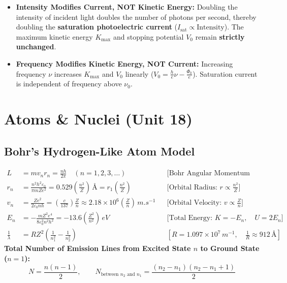 \documentclass[11pt,a4paper]{article}
\begin{document}
\begin{trapbox}
\begin{itemize}
  \item \textbf{Intensity Modifies Current, NOT Kinetic Energy:} Doubling the intensity of incident light doubles the number of photons per second, thereby doubling the \textbf{saturation photoelectric current} ($I_{\text{sat}} \propto \text{Intensity}$). The maximum kinetic energy $K_{\max}$ and stopping potential $V_0$ remain \textbf{strictly unchanged}.
  \item \textbf{Frequency Modifies Kinetic Energy, NOT Current:} Increasing frequency $\nu$ increases $K_{\max}$ and $V_0$ linearly ($V_0 = \frac{h}{e}\nu - \frac{\Phi_0}{e}$). Saturation current is independent of frequency above $\nu_0$.
\end{itemize}
\end{trapbox}

\newpage

\section{Atoms \& Nuclei (Unit 18)}

\subsection{Bohr's Hydrogen-Like Atom Model}

\begin{formulabox}
\begin{align}
  L &= m v_n r_n = \frac{n h}{2\pi} \quad (n = 1, 2, 3, \dots) && \text{[Bohr Angular Momentum Quantization]} \\
  r_n &= \frac{n^2 h^2 \varepsilon_0}{\pi m Z e^2} = 0.529\left(\frac{n^2}{Z}\right)\,\text{\AA} = r_1\left(\frac{n^2}{Z}\right) && \text{[Orbital Radius: } r \propto \frac{n^2}{Z}\text{]} \\
  v_n &= \frac{Z e^2}{2\varepsilon_0 n h} = \left(\frac{c}{137}\right)\frac{Z}{n} \approx 2.18\times 10^6\left(\frac{Z}{n}\right)\,\si{m.s^{-1}} && \text{[Orbital Velocity: } v \propto \frac{Z}{n}\text{]} \\
  E_n &= -\frac{m Z^2 e^4}{8\varepsilon_0^2 n^2 h^2} = -13.6\left(\frac{Z^2}{n^2}\right)\,\si{eV} && \text{[Total Energy: } K = -E_n, \quad U = 2E_n\text{]} \\
  \frac{1}{\lambda} &= R Z^2\left(\frac{1}{n_1^2} - \frac{1}{n_2^2}\right) && \left[R = 1.097\times 10^7\,\si{m^{-1}}, \quad \frac{1}{R} \approx 912\,\text{\AA}\right]
\end{align}
\textbf{Total Number of Emission Lines from Excited State $n$ to Ground State ($n=1$):}
\begin{equation}
  N = \frac{n(n - 1)}{2}, \qquad N_{\text{between } n_2 \text{ and } n_1} = \frac{(n_2 - n_1)(n_2 - n_1 + 1)}{2}
\end{equation}
\end{formulabox}
\end{document}
